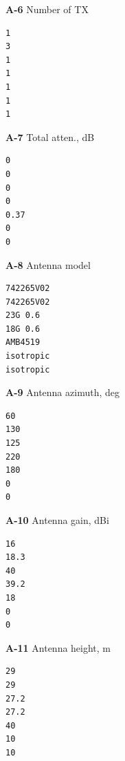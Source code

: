 \begin{minipage}[t]{0.325\textwidth}\small\textbf{A-6} Number of TX\\[-2pt]
\begin{Verbatim}[frame=single,framesep=1mm,fontsize=\footnotesize,rulecolor=\color{accent}]
1
3
1
1
1
1
1
\end{Verbatim}
\end{minipage}\hfill
\par\medskip
\noindent
\begin{minipage}[t]{0.325\textwidth}\small\textbf{A-7} Total atten., dB\\[-2pt]
\begin{Verbatim}[frame=single,framesep=1mm,fontsize=\footnotesize,rulecolor=\color{accent}]
0
0
0
0
0.37
0
0
\end{Verbatim}
\end{minipage}\hfill
\begin{minipage}[t]{0.325\textwidth}\small\textbf{A-8} Antenna model\\[-2pt]
\begin{Verbatim}[frame=single,framesep=1mm,fontsize=\footnotesize,rulecolor=\color{accent}]
742265V02
742265V02
23G 0.6
18G 0.6
AMB4519
isotropic
isotropic
\end{Verbatim}
\end{minipage}\hfill
\begin{minipage}[t]{0.325\textwidth}\small\textbf{A-9} Antenna azimuth, deg\\[-2pt]
\begin{Verbatim}[frame=single,framesep=1mm,fontsize=\footnotesize,rulecolor=\color{accent}]
60
130
125
220
180
0
0
\end{Verbatim}
\end{minipage}\hfill
\par\medskip
\noindent
\begin{minipage}[t]{0.325\textwidth}\small\textbf{A-10} Antenna gain, dBi\\[-2pt]
\begin{Verbatim}[frame=single,framesep=1mm,fontsize=\footnotesize,rulecolor=\color{accent}]
16
18.3
40
39.2
18
0
0
\end{Verbatim}
\end{minipage}\hfill
\begin{minipage}[t]{0.325\textwidth}\small\textbf{A-11} Antenna height, m\\[-2pt]
\begin{Verbatim}[frame=single,framesep=1mm,fontsize=\footnotesize,rulecolor=\color{accent}]
29
29
27.2
27.2
40
10
10
\end{Verbatim}
\end{minipage}\hfill
